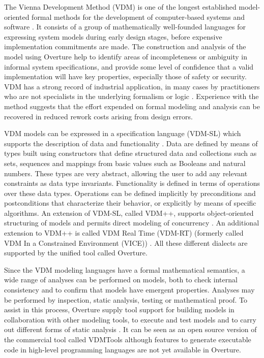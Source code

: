 \documentclass{overturerepsec}
\begin{document}
The Vienna Development Method (VDM) is one of the longest established
model-oriented formal methods for the development of computer-based
systems and software
\cite{Bjorner&78,Jones90a,Fitzgerald&08c}. It consists of a
group of mathematically well-founded languages for expressing system
models during early design stages, before expensive implementation
commitments are made. The construction and analysis of the model using
Overture help to identify areas of incompleteness or ambiguity in
informal system specifications, and provide some level of confidence
that a valid implementation will have key properties, especially those
of safety or security. VDM has a strong record of industrial
application, in many cases by practitioners who are not specialists in
the underlying formalism or logic
\cite{Larsen&95b,Clement&99,Kurita&09}. Experience with the method
suggests that the effort expended on formal modeling and analysis can
be recovered in reduced rework costs arising from design errors.

VDM models can be expressed in a specification language (VDM-SL) which
supports the description of data and functionality
\cite{ISOVDM96a,Fitzgerald&98b,Fitzgerald&09}. Data are defined by
means of types built using constructors that define structured data
and collections such as sets, sequences and mappings from basic values
such as Booleans and natural numbers. These types are very abstract, allowing
the user to add any relevant constraints as data type
invariants. Functionality is defined in terms of operations over these
data types. Operations can be defined implicitly by preconditions and
postconditions that characterize their behavior, or explicitly by
means of specific algorithms. An extension of VDM-SL, called VDM++,
supports object-oriented structuring of models and permits direct
modeling of concurrency \cite{Fitzgerald&05}. An additional extension
to VDM++ is called VDM Real Time (VDM-RT) (formerly called VDM In a
Constrained Environment (VICE)) \cite{Mukherjee&00,Verhoef&06b}. All
these different dialects are supported by the unified tool called Overture.

Since the VDM modeling languages have a formal mathematical semantics,
a wide range of analyses can be performed on models, both to check
internal consistency and to confirm that models have emergent
properties. Analyses may be performed by inspection, static analysis,
testing or mathematical proof. To assist in this process, Overture
supply tool support for building models in collaboration with other
modeling tools, to execute and test models and to carry out different
forms of static analysis \cite{Larsen&10a}. It can be seen as an open
source version of the commercial tool called VDMTools
\cite{Elmstrom&94,Larsen01,Fitzgerald&08a} although features to
generate executable code in high-level programming languages are
not yet available in Overture.
\end{document}
